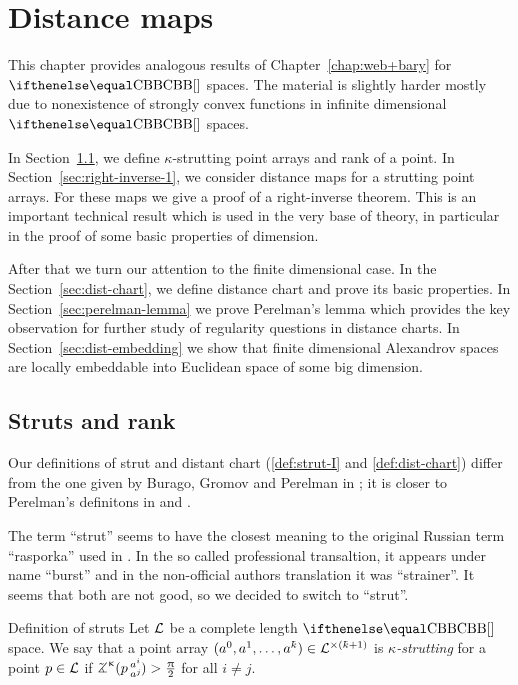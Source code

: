 \chapter{Distance maps %
}\label{chap:dist-maps}

This chapter provides analogous results of Chapter~\ref{chap:web+bary} for $\Alex{}$ spaces.
The material is slightly harder mostly due to nonexistence of strongly convex functions in infinite dimensional $\Alex{}$ spaces.

In Section~\ref{sec:struts+rank},
we define $\kappa$-strutting point arrays 
and rank of a point.
In Section~\ref{sec:right-inverse-1},
we consider distance maps for a strutting point arrays.
For these maps we give a proof of a right-inverse theorem.
This is an important technical result which is used in the very base of theory, in particular in the proof of some basic properties of dimension.

After that we turn our attention to the finite dimensional case.
In the Section~\ref{sec:dist-chart}, we define distance chart and prove its basic properties.
In Section~\ref{sec:perelman-lemma} we prove Perelman's lemma which provides the key observation for further study of regularity questions in distance charts.
In Section~\ref{sec:dist-embedding} we show that finite dimensional Alexandrov spaces are locally embeddable into Euclidean space of some big dimension.



\section{Struts and rank}\label{sec:struts+rank}

Our definitions of strut 
and distant chart 
(\ref{def:strut-I} and \ref{def:dist-chart}) 
differ from the one 
given by 
Burago, 
Gromov 
and Perelman in \cite{BGP};
it is closer to Perelman's definitons in \cite{perelman:spaces2} %
and \cite{perelman:morse}%
.

The term ``strut'' seems to have the closest meaning to the original Russian term ``rasporka''%
 used in \cite{BGP}.
In the so called professional transaltion,
it appears under name ``burst'' 
and in the non-official authors translation it was ``strainer''.
It seems that both are not good, 
so we decided to switch to ``strut''.

\begin{thm}{Definition of struts}\label{def:strut-I}
Let $\mathcal{L}$ be a complete length $\Alex{}$ space.
We say that a point array $(a^0,a^1,\dots,a^\kay)\in\spc{L}^{{\times}(\kay+1)}$
 is \emph{$\kappa$-strutting} for a point $p\in\spc{L}$ if $\angk\kappa p {a^i}{a^j}>\tfrac\pi2$ for all $i\not=j$.
\end{thm} 



